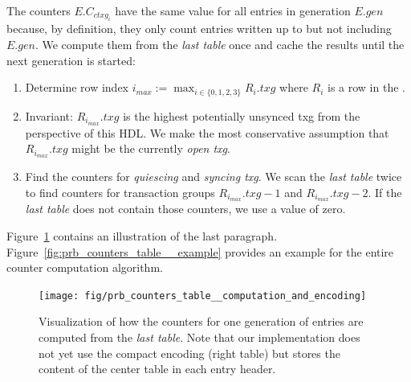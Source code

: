 \documentclass[12pt,a4paper,twoside]{book}
\begin{document}
The counters $E.C_{ctxg_i}$ have the same value for all entries in generation $E.gen$  because, by definition, they only count entries written up to but not including $E.gen$.
We compute them from the \textit{last table} once and cache the results until the next generation is started:
\begin{enumerate}[noitemsep]
    \item Determine row index $i_{max} := \max_{i \in \{0,1,2,3\}} R_i.txg$ where $R_i$ is a row in the .
    \item Invariant: $R_{i_{max}}.txg$ is the highest potentially unsynced txg from the perspective of this HDL.
        We make the most conservative assumption that $R_{i_{max}}.txg$ might be the currently \textit{open txg}.
    \item Find the counters for \textit{quiescing} and \textit{syncing txg}.
        We scan the \textit{last table} twice to find counters for transaction groups $R_{i_{max}}.txg - 1$ and $R_{i_{max}}.txg - 2$.
        If the \textit{last table} does not contain those counters, we use a value of zero.
\end{enumerate}
Figure~\ref{fig:prb_counters_table__computation_and_encoding} contains an illustration of the last paragraph.
Figure~\ref{fig:prb_counters_table__example} provides an example for the entire counter computation algorithm.

\begin{figure}[H]
    \centering
    \texttt{[image: fig/prb\_counters\_table\_\_computation\_and\_encoding]}
    \caption{
        Visualization of how the counters for one generation of entries are computed from the \textit{last table}.
        Note that our implementation does not yet use the compact encoding (right table) but stores the content of the center table in each entry header.
    }
    \label{fig:prb_counters_table__computation_and_encoding}
\end{figure}
\end{document}
